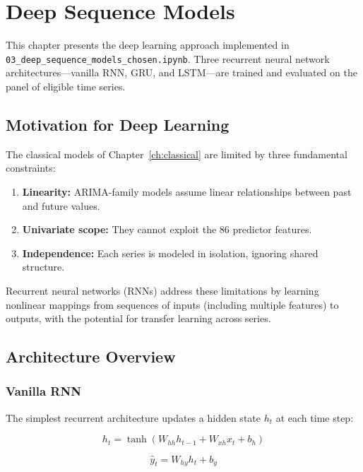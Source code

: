 \chapter{Deep Sequence Models}
\label{ch:deep}

This chapter presents the deep learning approach implemented in \texttt{03\_deep\_sequence\_models\_chosen.ipynb}. Three recurrent neural network architectures---vanilla RNN, GRU, and LSTM---are trained and evaluated on the panel of eligible time series.

\section{Motivation for Deep Learning}

The classical models of Chapter~\ref{ch:classical} are limited by three fundamental constraints:

\begin{enumerate}
    \item \textbf{Linearity:} ARIMA-family models assume linear relationships between past and future values.
    \item \textbf{Univariate scope:} They cannot exploit the 86 predictor features.
    \item \textbf{Independence:} Each series is modeled in isolation, ignoring shared structure.
\end{enumerate}

Recurrent neural networks (RNNs) address these limitations by learning nonlinear mappings from sequences of inputs (including multiple features) to outputs, with the potential for transfer learning across series.

\section{Architecture Overview}

\subsection{Vanilla RNN}

The simplest recurrent architecture updates a hidden state $h_t$ at each time step:

\begin{equation}
h_t = \tanh(W_{hh} h_{t-1} + W_{xh} x_t + b_h)
\end{equation}

\begin{equation}
\hat{y}_t = W_{hy} h_t + b_y
\end{equation}

